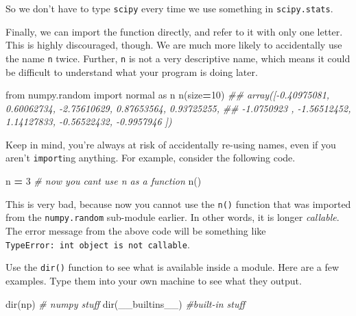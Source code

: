 \documentclass[
  12pt,
  krantz2]{krantz}
\makeatletter
\newenvironment{Shaded}{\begin{snugshade}}{\end{snugshade}}
\newcommand{\BuiltInTok}[1]{#1}
\newcommand{\CommentTok}[1]{\textcolor[rgb]{0.37,0.37,0.37}{\textit{#1}}}
\newcommand{\DecValTok}[1]{\textcolor[rgb]{0.06,0.06,0.06}{#1}}
\newcommand{\ImportTok}[1]{#1}
\newcommand{\NormalTok}[1]{#1}
\newcommand{\OperatorTok}[1]{\textcolor[rgb]{0.43,0.43,0.43}{\textbf{#1}}}
\newenvironment{kframe}{%
\medskip{}
\setlength{\fboxsep}{.8em}
 \def\at@end@of@kframe{}%
 \ifinner\ifhmode%
  \def\at@end@of@kframe{\end{minipage}}%
  \begin{minipage}{\columnwidth}%
 \fi\fi%
 \def\FrameCommand##1{\hskip\@totalleftmargin \hskip-\fboxsep
 \colorbox{shadecolor}{##1}\hskip-\fboxsep
     \hskip-\linewidth \hskip-\@totalleftmargin \hskip\columnwidth}%
 \MakeFramed {\advance\hsize-\width
   \@totalleftmargin\z@ \linewidth\hsize
   \@setminipage}}%
 {\par\unskip\endMakeFramed%
 \at@end@of@kframe}
\renewenvironment{Shaded}{\begin{kframe}}{\end{kframe}}
\makeatother
\begin{document}
So we don't have to type \texttt{scipy} every time we use something in \texttt{scipy.stats}.

Finally, we can import the function directly, and refer to it with only one letter. This is highly discouraged, though. We are much more likely to accidentally use the name \texttt{n} twice. Further, \texttt{n} is not a very descriptive name, which means it could be difficult to understand what your program is doing later.

\begin{Shaded}
\begin{Highlighting}[]
\ImportTok{from}\NormalTok{ numpy.random }\ImportTok{import}\NormalTok{ normal }\ImportTok{as}\NormalTok{ n}
\NormalTok{n(size}\OperatorTok{=}\DecValTok{10}\NormalTok{)}
\CommentTok{\#\# array([{-}0.40975081,  0.60062734, {-}2.75610629,  0.87653564,  0.93725255,}
\CommentTok{\#\#        {-}1.0750923 , {-}1.56512452,  1.14127833, {-}0.56522432, {-}0.9957946 ])}
\end{Highlighting}
\end{Shaded}

Keep in mind, you're always at risk of accidentally re-using names, even if you aren't \texttt{import}ing anything. For example, consider the following code.

\begin{Shaded}
\begin{Highlighting}[]
\NormalTok{n }\OperatorTok{=} \DecValTok{3} \CommentTok{\# now you can\textquotesingle{}t use n as a function }
\NormalTok{n()   }
\end{Highlighting}
\end{Shaded}

This is very bad, because now you cannot use the \texttt{n()} function that was imported from the \texttt{numpy.random} sub-module earlier. In other words, it is longer \emph{callable}. The error message from the above code will be something like \texttt{TypeError:\ \textquotesingle{}int\textquotesingle{}\ object\ is\ not\ callable}.

Use the \texttt{dir()} function to see what is available inside a module. Here are a few examples. Type them into your own machine to see what they output.

\begin{Shaded}
\begin{Highlighting}[]
\BuiltInTok{dir}\NormalTok{(np) }\CommentTok{\# numpy stuff}
\BuiltInTok{dir}\NormalTok{(\_\_builtins\_\_) }\CommentTok{\#built{-}in stuff}
\end{Highlighting}
\end{Shaded}
\end{document}
